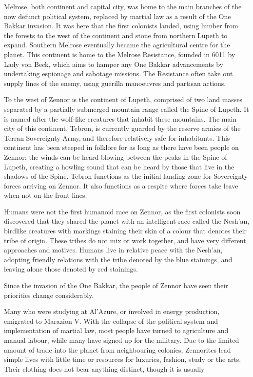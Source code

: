 Melrose, both continent and capital city, was home to the main branches of the now defunct political system, replaced by martial law as a result of the One Bakkar invasion. It was here that the first colonists landed, using lumber from the forests to the west of the continent and stone from northern Lupeth to expand. Southern Melrose eventually became the agricultural centre for the planet. This continent is home to the Melrose Resistance, founded in 6011 by Lady von Beck, which aims to hamper any One Bakkar advancements by undertaking espionage and sabotage missions. The Resistance often take out supply lines of the enemy, using guerilla manoeuvres and partisan actions.

To the west of Zennor is the continent of Lupeth, comprised of two land masses separated by a partially submerged mountain range called the Spine of Lupeth. It is named after the wolf-like creatures that inhabit these mountains. The main city of this continent, Tebron, is currently guarded by the reserve armies of the Terran Sovereignty Army, and therefore relatively safe for inhabitants. This continent has been steeped in folklore for as long as there have been people on Zennor: the winds can be heard blowing between the peaks in the Spine of Lupeth, creating a howling sound that can be heard by those that live in the shadows of the Spine. Tebron functions as the initial landing zone for Sovereignty forces arriving on Zennor. It also functions as a respite where forces take leave when not on the front lines.

Humans were not the first humanoid race on Zennor, as the first colonists soon discovered that they shared the planet with an intelligent race called the Nesh'an, birdlike creatures with markings staining their skin of a colour that denotes their tribe of origin. These tribes do not mix or work together, and have very different approaches and motives. Humans live in relative peace with the Nesh'an, adopting friendly relations with the tribe denoted by the blue stainings, and leaving alone those denoted by red stainings.

Since the invasion of the One Bakkar, the people of Zennor have seen their priorities change considerably.

Many who were studying at Al'Azure, or involved in energy production, emigrated to Marazion V. With the collapse of the political system and implementation of martial law, most people have turned to agriculture and manual labour, while many have signed up for the military. Due to the limited amount of trade into the planet from neighbouring colonies, Zennorites lead simple lives with little time or resources for luxuries, fashion, study or the arts. Their clothing does not bear anything distinct, though it is usually

